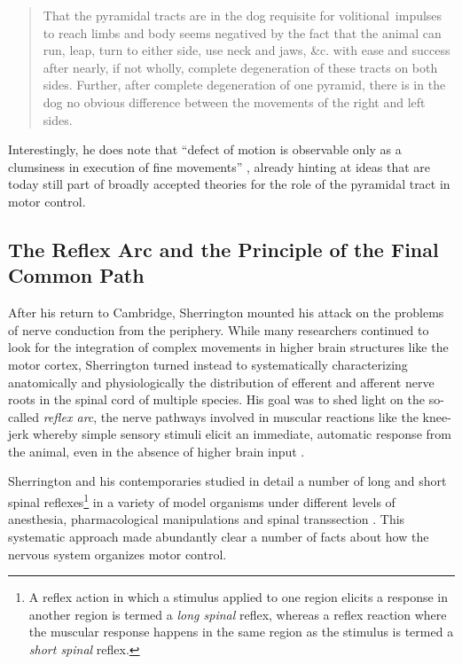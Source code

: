 \blockquote[{\protect\cite[p.189]{Sherrington1885}}]{That the pyramidal tracts are in the dog requisite for volitional~impulses to reach limbs and body seems negatived by the fact that the animal can run, leap, turn to either side, use neck and jaws, \&c. with ease and success after nearly, if not wholly, complete degeneration of these tracts on both sides. Further, after complete degeneration of one pyramid, there is in the dog no obvious difference between the movements of the right and left sides.}

Interestingly, he does note that \enquote{defect of motion is observable only as a clumsiness in execution of fine movements} \cite{Sherrington1885}, already hinting at ideas that are today still part of broadly accepted theories for the role of the pyramidal tract in motor control.

\subsection{The Reflex Arc and the Principle of the Final Common Path}

After his return to Cambridge, Sherrington mounted his attack on the problems of nerve conduction from the periphery. While many researchers continued to look for the integration of complex movements in higher brain structures like the motor cortex, Sherrington turned instead to systematically characterizing anatomically and physiologically the distribution of efferent \cite{Sherrington1892} and afferent \cite{Sherrington1893a} nerve roots in the spinal cord of multiple species. His goal was to shed light on the so-called \emph{reflex arc}, the nerve pathways involved in muscular reactions like the knee-jerk whereby simple sensory stimuli elicit an immediate, automatic response from the animal, even in the absence of higher brain input \cite{Sherrington1893b}.

Sherrington and his contemporaries studied in detail a number of long and short spinal reflexes\footnote{A reflex action in which a stimulus applied to one region elicits a response in another region is termed a \emph{long spinal} reflex, whereas a reflex reaction where the muscular response happens in the same region as the stimulus is termed a \emph{short spinal} reflex.} in a variety of model organisms under different levels of anesthesia, pharmacological manipulations and spinal transsection \cite{Sherrington1903}. This systematic approach made abundantly clear a number of facts about how the nervous system organizes motor control.

